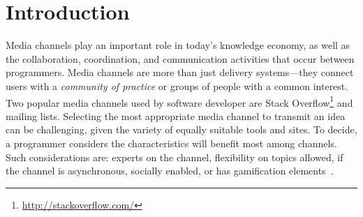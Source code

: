 \section{Introduction}
\label{cha:introduction}


Media channels play an important role in today's knowledge economy, as well as the collaboration, coordination, and communication activities that occur between programmers.
Media channels are more than just delivery systems---they connect users with a \textit{community of practice} or groups of people with a common interest.
Two popular media channels used by software developer are Stack Overflow\footnote{\url{http://stackoverflow.com/}} and mailing lists.
Selecting the most appropriate media channel to transmit an idea can be challenging, given the variety of equally suitable tools and sites.
To decide, a programmer considers the characteristics will benefit most among channels.
Such considerations are: experts on the channel, flexibility on topics allowed, if the channel is asynchronous, socially enabled, or has gamification elements~\cite{Vasilescu2014c}.




